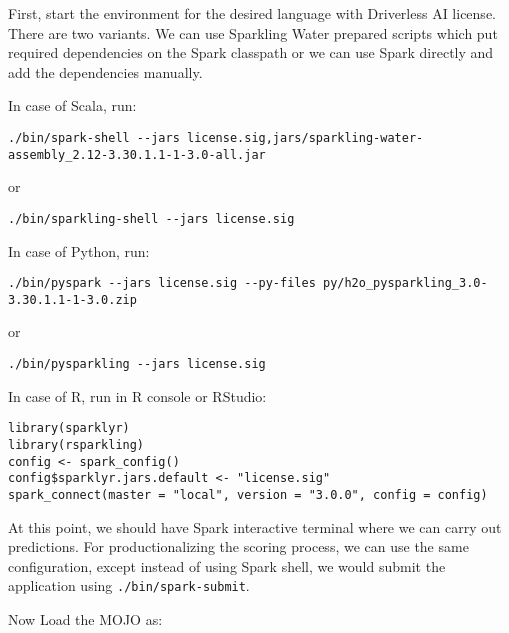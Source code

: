 First, start the environment for the desired language with Driverless AI license. There are two variants. We can use
Sparkling Water prepared scripts which put required dependencies on the Spark classpath or we can use Spark directly
and add the dependencies manually.

In case of Scala, run:
\begin{lstlisting}[style=Bash]
./bin/spark-shell --jars license.sig,jars/sparkling-water-assembly_2.12-3.30.1.1-1-3.0-all.jar
\end{lstlisting}

or

\begin{lstlisting}[style=Bash]
./bin/sparkling-shell --jars license.sig
\end{lstlisting}

In case of Python, run:

\begin{lstlisting}[style=Bash]
./bin/pyspark --jars license.sig --py-files py/h2o_pysparkling_3.0-3.30.1.1-1-3.0.zip
\end{lstlisting}

or

\begin{lstlisting}[style=Bash]
./bin/pysparkling --jars license.sig
\end{lstlisting}

In case of R, run in R console or RStudio:

\begin{lstlisting}[style=R]
library(sparklyr)
library(rsparkling)
config <- spark_config()
config$sparklyr.jars.default <- "license.sig"
spark_connect(master = "local", version = "3.0.0", config = config)
\end{lstlisting}


At this point, we should have Spark interactive terminal where we can carry out predictions.
For productionalizing the scoring process, we can use the same configuration,
except instead of using Spark shell, we would submit the application using \texttt{./bin/spark-submit}.

Now Load the MOJO as:

